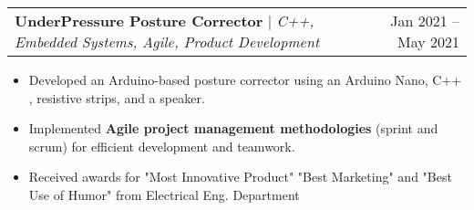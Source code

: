 \documentclass[A4,10pt]{article}
\makeatletter
\newcommand{\resumeItem}[1]{
  \item\small{
    {#1 \vspace{-2pt}}
  }
}
\newcommand{\resumeProjectHeading}[2]{
    \item
    \begin{tabular*}{0.97\textwidth}{l@{\extracolsep{\fill}}r}
      \small#1 & #2 \\
    \end{tabular*}\vspace{-7pt}
}
\newcommand{\resumeItemListStart}{\begin{itemize}}
\newcommand{\resumeItemListEnd}{\end{itemize}\vspace{-5pt}}
\makeatother
\begin{document}
        

        \resumeProjectHeading
        {\textbf{UnderPressure Posture Corrector} $|$ \emph{C++, Embedded Systems, Agile, Product Development}}{Jan 2021 -- May 2021}
        \resumeItemListStart
          \resumeItem{Developed an Arduino-based posture corrector using an Arduino Nano, C++ , resistive strips, and a speaker.}
          \resumeItem{Implemented \textbf{Agile project management methodologies} (sprint and scrum) for efficient development and teamwork.}
          \resumeItem{Received awards for "Most Innovative Product" "Best Marketing" and "Best Use of Humor" from Electrical Eng. Department}
        \resumeItemListEnd

        
\end{document}
